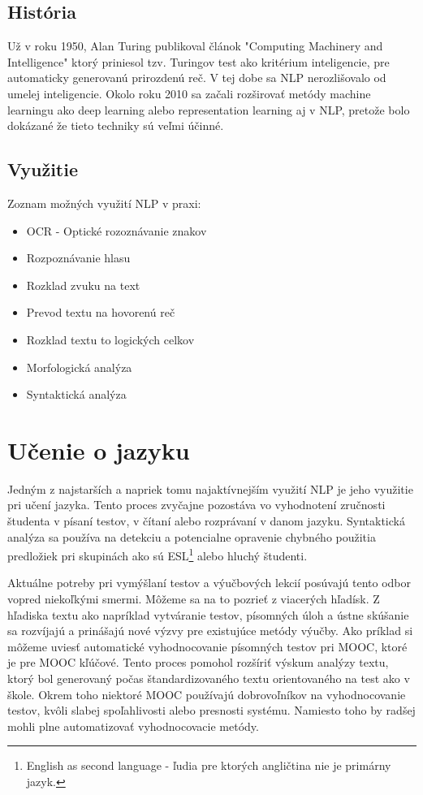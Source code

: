 \documentclass[10pt,slovak,a4paper,twoside]{article}
\begin{document}
\subsection{História}
	Už v roku 1950, Alan Turing publikoval článok "Computing Machinery and Intelligence"\cite{turing2009computing} 
	ktorý priniesol tzv. Turingov test ako kritérium inteligencie, pre automaticky generovanú 
	prirozdenú reč. V tej dobe sa NLP nerozlišovalo od umelej inteligencie.\linebreak
	Okolo roku 2010 sa začali rozširovať metódy machine learningu ako deep learning alebo 
	representation learning aj v NLP, pretože bolo dokázané že tieto techniky sú veľmi účinné.
\subsection{Využitie}
Zoznam možných využití NLP v praxi:
\begin{itemize}
	\item OCR - Optické rozoznávanie znakov
	\item Rozpoznávanie hlasu
	\item Rozklad zvuku na text
	\item Prevod textu na hovorenú reč
	\item Rozklad textu to logických celkov
	\item Morfologická analýza
	\item Syntaktická analýza
\end{itemize}
\section{Učenie o jazyku} \label{ucenie_o_jazyku}
		Jedným z najstarších a napriek tomu najaktívnejším využití NLP je jeho využitie pri učení jazyka.
	Tento proces zvyčajne pozostáva vo vyhodnotení zručnosti študenta v písaní testov, v čítaní alebo
	rozprávaní v danom jazyku. Syntaktická analýza sa používa na detekciu a potencialne opravenie chybného použitia
	predložiek pri skupinách ako sú ESL\footnote{English as second language - ľudia pre ktorých angličtina nie je primárny jazyk.} alebo hluchý študenti.

	Aktuálne potreby pri vymýšlaní testov a výučbových lekcií posúvajú tento odbor vopred niekoľkými smermi. Môžeme sa na to pozrieť z viacerých hľadísk. 
	Z hľadiska textu ako napríklad vytváranie testov, písomných úloh a ústne skúšanie sa rozvíjajú a prinášajú nové výzvy pre existujúce metódy výučby.
	Ako príklad si môžeme uviesť automatické vyhodnocovanie písomných testov pri MOOC, ktoré je pre MOOC kľúčové. Tento proces pomohol rozšíriť výskum analýzy textu, 
	ktorý bol generovaný počas štandardizovaného textu orientovaného na test ako v škole. Okrem toho niektoré MOOC používajú dobrovoľníkov na vyhodnocovanie testov, 
	kvôli slabej spoľahlivosti alebo presnosti systému. Namiesto toho by radšej mohli plne automatizovať vyhodnocovacie metódy.
\end{document}

